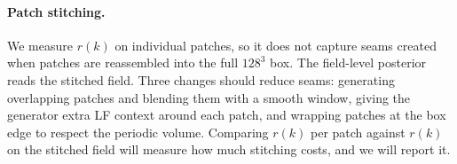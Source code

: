 \documentclass{article} %
\begin{document}
\paragraph{Patch stitching.} We measure $r(k)$ on individual patches, so it does not
capture seams created when patches are reassembled into the full $128^3$ box. The
field-level posterior reads the stitched field. Three changes should reduce seams:
generating overlapping patches and blending them with a smooth window, giving the
generator extra LF context around each patch, and wrapping patches at the box edge
to respect the periodic volume. Comparing $r(k)$ per patch against $r(k)$ on the
stitched field will measure how much stitching costs, and we will report it.



\end{document}
